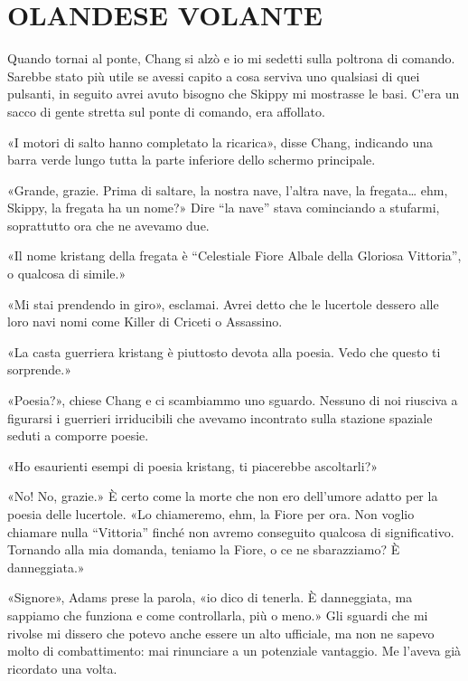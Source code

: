 \chapter{OLANDESE VOLANTE}\label{olandese-volante}

\hfill\break

Quando tornai al ponte, Chang si alzò e io mi sedetti sulla poltrona di
comando. Sarebbe stato più utile se avessi capito a cosa serviva uno
qualsiasi di quei pulsanti, in seguito avrei avuto bisogno che Skippy mi
mostrasse le basi. C'era un sacco di gente stretta sul ponte di comando,
era affollato.

«I motori di salto hanno completato la ricarica», disse Chang, indicando
una barra verde lungo tutta la parte inferiore dello schermo principale.

«Grande, grazie. Prima di saltare, la nostra nave, l'altra nave, la
fregata\ldots{} ehm, Skippy, la fregata ha un nome?» Dire ``la nave''
stava cominciando a stufarmi, soprattutto ora che ne avevamo due.

«Il nome kristang della fregata è ``Celestiale Fiore Albale della
Gloriosa Vittoria'', o qualcosa di simile.»

«Mi stai prendendo in giro», esclamai. Avrei detto che le lucertole
dessero alle loro navi nomi come Killer di Criceti o Assassino.

«La casta guerriera kristang è piuttosto devota alla poesia. Vedo che
questo ti sorprende.»

«Poesia?», chiese Chang e ci scambiammo uno sguardo. Nessuno di noi
riusciva a figurarsi i guerrieri irriducibili che avevamo incontrato
sulla stazione spaziale seduti a comporre poesie.

«Ho esaurienti esempi di poesia kristang, ti piacerebbe ascoltarli?»

«No! No, grazie.» È certo come la morte che non ero dell'umore adatto
per la poesia delle lucertole. «Lo chiameremo, ehm, la Fiore per ora.
Non voglio chiamare nulla ``Vittoria'' finché non avremo conseguito
qualcosa di significativo. Tornando alla mia domanda, teniamo la Fiore,
o ce ne sbarazziamo? È danneggiata.»

«Signore», Adams prese la parola, «io dico di tenerla. È danneggiata, ma
sappiamo che funziona e come controllarla, più o meno.» Gli sguardi che
mi rivolse mi dissero che potevo anche essere un alto ufficiale, ma non
ne sapevo molto di combattimento: mai rinunciare a un potenziale
vantaggio. Me l'aveva già ricordato una volta.

